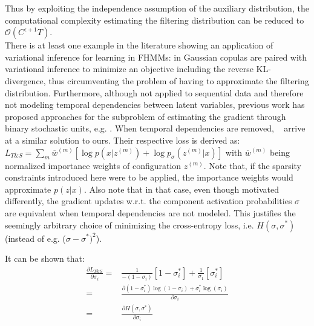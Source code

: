 Thus by exploiting the independence assumption of the auxiliary distribution, the computational complexity estimating the filtering distribution can be reduced to $\mathcal{O}(C^{\epsilon+1} T)$.\\
There is at least one example in the literature showing an application of variational inference for learning in FHMMs: in \cite{ng2016scaling} Gaussian copulas are paired with variational inference to minimize an objective including the reverse KL-divergence, thus circumventing the problem of having to approximate the filtering distribution. Furthermore, although not applied to sequential data and therefore not modeling temporal dependencies between latent variables, previous work has proposed approaches for the subproblem of estimating the gradient through binary stochastic units, e.g. \cite{raiko2014techniques,bengio2013estimating}. When temporal dependencies are removed, ~\cite{tang2013learning} arrive at a similar solution to ours. Their respective loss is derived as: $L_{T\&S} = \sum_m \overline{w}^{(m)}[\log p(x|z^{(m)}) + \log p_{\sigma}(z^{(m)}|x)]$ with $\overline{w}^{(m)}$ being normalized importance weights of configuration $z^{(m)}$. Note that, if the sparsity constraints introduced here were to be applied, the importance weights would approximate $p(z|x)$. Also note that in that case, even though motivated differently, the gradient updates w.r.t. the component activation probabilities $\sigma$ are equivalent when temporal dependencies are not modeled. This justifies the seemingly arbitrary choice of minimizing the cross-entropy loss, i.e. $H(\sigma, \sigma^*)$ (instead of e.g. ($\sigma - \sigma^*)^2$). 

It can be shown that:
\begin{align*}
\frac{\partial L_{T\&S}}{\partial \sigma_i}=& \frac{1}{-(1-\sigma_i)}[1-\sigma_i^*]+ \frac{1}{\sigma_1}[\sigma_i^*]\\
 =&  \frac{\partial (1-\sigma_i^*)\log(1-\sigma_i) + \sigma_i^*\log(\sigma_i)}{\partial \sigma_i} \\
 =&  \frac{\partial H(\sigma, \sigma^*)}{\partial \sigma_i} 
\end{align*}

